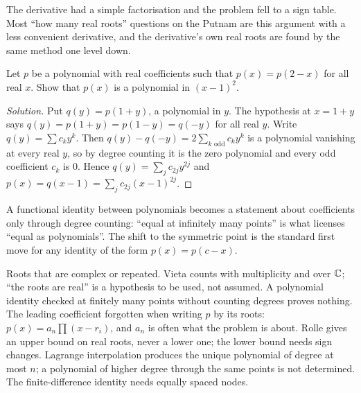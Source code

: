 The derivative had a simple factorisation and the problem fell to a sign table. Most ``how many real roots'' questions on the Putnam are this argument with a less convenient derivative, and the derivative's own real roots are found by the same method one level down.

\begin{example}
Let $p$ be a polynomial with real coefficients such that $p(x) = p(2 - x)$ for all real $x$. Show that $p(x)$ is a polynomial in $(x - 1)^2$.
\end{example}

\begin{proof}[Solution]
Put $q(y) = p(1 + y)$, a polynomial in $y$. The hypothesis at $x = 1 + y$ says $q(y) = p(1 + y) = p(1 - y) = q(-y)$ for all real $y$. Write $q(y) = \sum c_k y^k$. Then $q(y) - q(-y) = 2 \sum_{k \text{ odd}} c_k y^k$ is a polynomial vanishing at every real $y$, so by degree counting it is the zero polynomial and every odd coefficient $c_k$ is $0$. Hence $q(y) = \sum_j c_{2j} y^{2j}$ and $p(x) = q(x - 1) = \sum_j c_{2j} (x - 1)^{2j}$.
\end{proof}

A functional identity between polynomials becomes a statement about coefficients only through degree counting: ``equal at infinitely many points'' is what licenses ``equal as polynomials''. The shift to the symmetric point is the standard first move for any identity of the form $p(x) = p(c - x)$.

\begin{trap}
Roots that are complex or repeated. Vieta counts with multiplicity and over $\mathbb{C}$; ``the roots are real'' is a hypothesis to be used, not assumed. A polynomial identity checked at finitely many points without counting degrees proves nothing. The leading coefficient forgotten when writing $p$ by its roots: $p(x) = a_n \prod (x - r_i)$, and $a_n$ is often what the problem is about. Rolle gives an upper bound on real roots, never a lower one; the lower bound needs sign changes. Lagrange interpolation produces the unique polynomial of degree at most $n$; a polynomial of higher degree through the same points is not determined. The finite-difference identity needs equally spaced nodes.
\end{trap}

